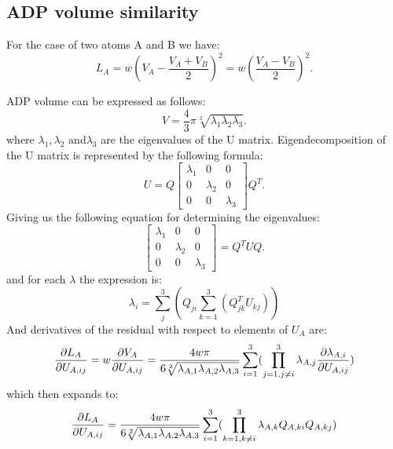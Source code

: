 \documentclass[pdf]{iucr}
\begin{document}
\subsection{ADP volume similarity}
For the case of two atoms A and B we have:
\begin{equation}
L_{A} = w  \left(V_{A}-\frac{V_{A}+V_{B}}{2}\right)^2 = w \left( \frac{V_{A}-V_{B}}{2}\right) ^2.
\end{equation}

ADP volume can be expressed as follows:
\begin{equation}
V = \frac{4}{3}\pi \sqrt[2]{\lambda_{1}\lambda_{2}\lambda_{3}}.
\end{equation}
where $\lambda_{1}, \lambda_{2}$ and$ \lambda_{3}$ are the eigenvalues of the U matrix. Eigendecomposition of the U matrix is represented by the following formula:
\begin{equation}
U = Q\begin{bmatrix}\lambda_{1}&0&0\\0&\lambda_{2}&0\\0&0&\lambda_{3}\end{bmatrix} Q^{T}.
\end{equation}
Giving us the following equation for determining the eigenvalues:
\begin{equation}
\begin{bmatrix}\lambda_{1}&0&0\\0&\lambda_{2}&0\\0&0&\lambda_{3}\end{bmatrix} = Q^{T}UQ.
\end{equation}
and for each $\lambda$ the expression is:
\begin{equation}
\lambda_{i} = \sum_{j}^3\left(Q_{ji}\sum_{k=1}^3(Q^{T}_{jk}U_{kj})\right)
\end{equation}
And derivatives of the residual with respect to elements of $U_{A}$ are:
\begin{equation}
\frac{\partial L_{A}}{\partial U_{A,ij}} = w \frac{\partial V_{A}}{\partial U_{A,ij}} = \frac{4w\pi}{6\sqrt[2]{\lambda_{A,1}\lambda_{A,2}\lambda_{A,3}}} \sum_{i=1}^3(\prod_{j=1, j \neq i}^3\lambda_{A,j}\frac{\partial \lambda_{A,i}}{\partial U_{A,ij}})
\end{equation}
which then expands to:
\begin{equation}
\frac{\partial L_{A}}{\partial U_{A,ij}} = \frac{4w\pi}{6\sqrt[2]{\lambda_{A,1}\lambda_{A,2}\lambda_{A,3}}} \sum_{i=1}^3(\prod_{k=1, k \neq i}^3\lambda_{A,k}Q_{A,ki}Q_{A,kj})
\end{equation}
\end{document}
